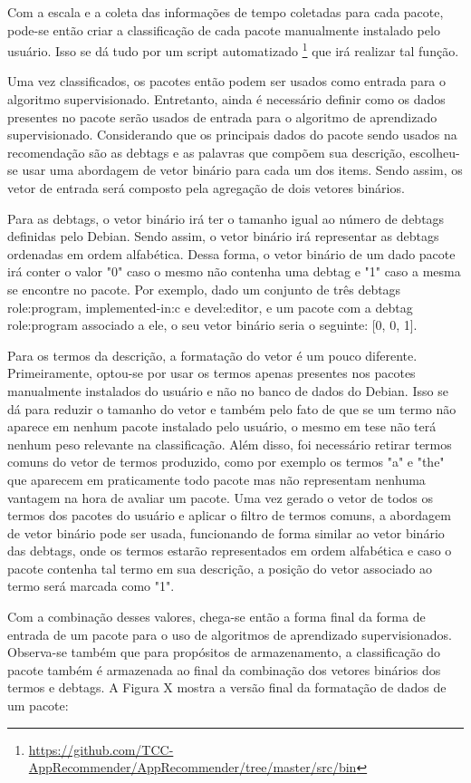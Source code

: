 Com a escala e a coleta das informações de tempo coletadas para cada pacote,
pode-se então criar a classificação de cada pacote manualmente instalado pelo usuário.
Isso se dá tudo por um script automatizado \footnote{\url{https://github.com/TCC-AppRecommender/AppRecommender/tree/master/src/bin}}
que irá realizar tal função.

Uma vez classificados, os pacotes então podem ser usados como entrada para o algoritmo supervisionado.
Entretanto, ainda é necessário definir como os dados presentes no pacote serão usados de entrada para o
algoritmo de aprendizado supervisionado. Considerando que os principais dados do pacote sendo usados na
recomendação são as debtags e as palavras que compõem sua descrição, escolheu-se usar uma abordagem de
vetor binário para cada um dos items. Sendo assim, os vetor de entrada será composto pela agregação de dois vetores
binários.

Para as debtags, o vetor binário irá ter o tamanho igual ao número de debtags definidas pelo Debian. Sendo assim, o
vetor binário irá representar as debtags ordenadas em ordem alfabética. Dessa forma,
o vetor binário de um dado pacote irá conter o valor "0" caso o mesmo não contenha uma debtag e "1" caso a mesma se encontre
no pacote. Por exemplo, dado um conjunto de três debtags role:program, implemented-in:c e devel:editor, e um pacote com a debtag
role:program associado a ele, o seu vetor binário seria o seguinte: [0, 0, 1].

Para os termos da descrição, a formatação do vetor é um pouco diferente. Primeiramente, optou-se por usar os termos apenas presentes
nos pacotes manualmente instalados do usuário e não no banco de dados do Debian. Isso se dá para reduzir o tamanho do vetor e também
pelo fato de que se um termo não aparece em nenhum pacote instalado pelo usuário, o mesmo em tese não terá nenhum peso relevante na
classificação. Além disso, foi necessário retirar termos comuns do vetor de termos produzido, como por exemplo os termos "a" e "the" que
aparecem em praticamente todo pacote mas não representam nenhuma vantagem na hora de avaliar um pacote. Uma vez gerado o vetor de todos os
termos dos pacotes do usuário e aplicar o filtro de termos comuns, a abordagem de vetor binário pode ser usada, funcionando de forma
similar ao vetor binário das debtags, onde os termos estarão representados em ordem alfabética e caso o pacote contenha tal termo em sua
descrição, a posição do vetor associado ao termo será marcada como "1".

Com a combinação desses valores, chega-se então a forma final da forma de entrada de um pacote para o uso de algoritmos de aprendizado
supervisionados. Observa-se também que para propósitos de  armazenamento, a classificação do pacote também é armazenada ao final da combinação
dos vetores binários dos termos e debtags. A Figura X mostra a versão final da formatação de dados de um pacote:

